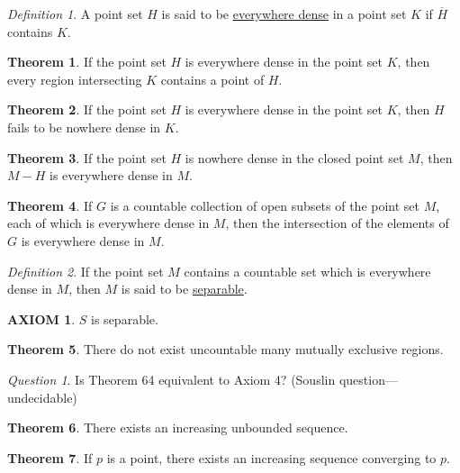 \documentclass[12pt, oneside, letter] {amsart}
\theoremstyle {definition}
\newtheorem {thm} {Theorem}
\newtheorem {ax} {AXIOM}
\theoremstyle {remark}
\newtheorem* {defn} {Definition}
\newtheorem* {qn} {Question}
\begin{document}
\begin{defn}
  A point set $H$ is said to be \underline {everywhere dense} in a
  point set $K$ if $\overline H$ contains $K$.
\end{defn}

\begin{thm}
  If the point set $H$ is everywhere dense in the point set $K$, then
  every region intersecting $K$ contains a point of $H$.
\end{thm}

\begin{thm}
  If the point set $H$ is everywhere dense in the point set $K$, then
  $H$ fails to be nowhere dense in $K$.
\end{thm}

\begin{thm}
  If the point set $H$ is nowhere dense in the closed point set $M$,
  then $M - H$ is everywhere dense in $M$.
\end{thm}

\begin{thm}
  If $G$ is a countable collection of open subsets of the point set
  $M$, each of which is everywhere dense in $M$, then the intersection
  of the elements of $G$ is everywhere dense in $M$.
\end{thm}

\begin{defn}
  If the point set $M$ contains a countable set which is everywhere
  dense in $M$, then $M$ is said to be \underline {separable}.
\end{defn}

\begin{ax}
  $S$ is separable.
\end{ax}

\begin{thm}
  There do not exist uncountable many mutually exclusive regions.
\end{thm}

\begin{qn}
  Is Theorem 64 equivalent to Axiom 4? (Souslin
  question---undecidable)
\end{qn}

\begin{thm}
  There exists an increasing unbounded sequence.
\end{thm}

\begin{thm}
  If $p$ is a point, there exists an increasing sequence converging to
  $p$.
\end{thm}
\end{document}
